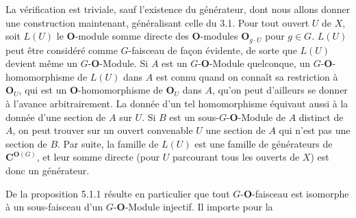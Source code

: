 La vérification est triviale, sauf l'existence du générateur, dont nous allons
donner une construction maintenant, généralisant celle du 3.1.
Pour tout ouvert $U$ de $X$, soit $L(U)$ le ${\mathbf O}$-module somme directe des
${\mathbf O}$-modules ${\mathbf O}_{g\cdot U}$ pour $g\in G$. $L(U)$ peut être considéré comme
$G$-faisceau de façon évidente, de sorte que $L(U)$ devient même un
$G$-${\mathbf O}$-Module. Si $A$ est un $G$-${\mathbf O}$-Module quelconque, un
$G$-${\mathbf O}$-homomorphisme de $L(U)$ dans $A$ est connu quand on connaît sa
restriction à ${\mathbf O}_U$, qui est un ${\mathbf O}$-homomorphisme de ${\mathbf O}_U$ dans $A$, qu'on
peut d'ailleurs se donner à l'avance arbitrairement. La donnée d'un tel
homomorphisme équivaut aussi à la donnée d'une section de $A$ sur $U$.
Si $B$ est un sous-$G$-${\mathbf O}$-Module de $A$ distinct de $A$, on peut trouver sur
un ouvert convenable $U$ une section de $A$ qui n'est pas une section de $B$.
Par suite, la famille de $L(U)$ est une famille de générateurs de ${\mathbf C}^{{\mathbf O}(G)}$,
et leur somme directe (pour $U$ parcourant tous les ouverts de $X$) est donc
un générateur.

De la proposition 5.1.1 résulte en particulier que tout $G$-${\mathbf O}$-faisceau est
isomorphe à un sous-faisceau d'un $G$-${\mathbf O}$-Module injectif. Il importe pour la


